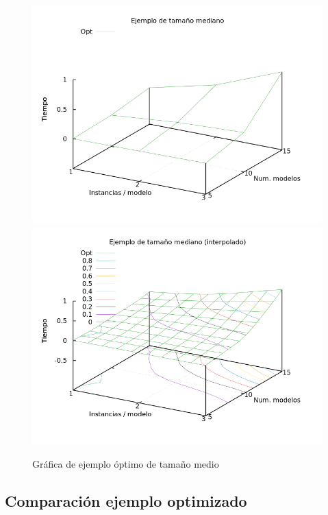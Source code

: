 \begin{figure}[H]
\centering
\includegraphics[scale=0.5]{img/opt-mid}
\includegraphics[scale=0.5]{img/opt-mid-spl}
\caption{Gráfica de ejemplo óptimo de tamaño medio
\label{fig:grfoptmid}}
\end{figure}









\subsection{Comparación ejemplo optimizado}


